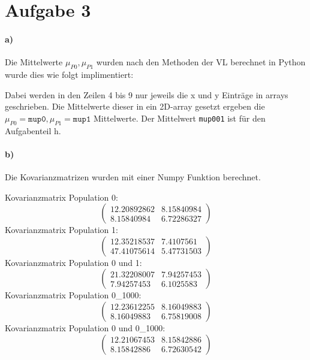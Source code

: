 \section{Aufgabe 3}

\label{sec:Aufgab3}
% 
\paragraph{a)}
Die Mittelwerte $\mu_{P0},\mu_{P1}$ wurden nach den Methoden der VL berechnet in Python wurde dies wie folgt
implimentiert:

Dabei werden in den Zeilen 4 bis 9 nur jeweils die x und y Einträge in arrays geschrieben. Die Mittelwerte
dieser in ein 2D-array gesetzt ergeben die $\mu_{P0}= \texttt{mup0},\mu_{P1}=\texttt{mup1}$ Mittelwerte.
Der Mittelwert \texttt{mup001} ist für den Aufgabenteil h.
\paragraph{b)}
Die Kovarianzmatrizen wurden mit einer Numpy Funktion berechnet.

Kovarianzmatrix Population 0:
\begin{equation}
\begin{pmatrix}
12.20892862& 8.15840984\\
8.15840984& 6.72286327
\end{pmatrix}
\end{equation}
Kovarianzmatrix Population 1:
\begin{equation}
\begin{pmatrix}
12.35218537 & 7.4107561\\4
 7.41075614 & 5.47731503
\end{pmatrix}
\end{equation}
Kovarianzmatrix Population 0 und 1:
\begin{equation}
\begin{pmatrix}
21.32208007 & 7.94257453\\
 7.94257453 & 6.1025583
\end{pmatrix}
\end{equation}
Kovarianzmatrix Population 0\_1000:
\begin{equation}
\begin{pmatrix}
12.23612255 & 8.16049883\\
 8.16049883 & 6.75819008
\end{pmatrix}
\end{equation}
Kovarianzmatrix Population 0 und 0\_1000:
\begin{equation}
\begin{pmatrix}
12.21067453 & 8.15842886\\
 8.15842886 & 6.72630542
\end{pmatrix}
\end{equation}
